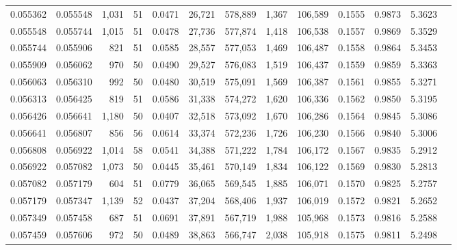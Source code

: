 \begin{tabular}{rrrrrrrrrrrrr}
0.055362 & 0.055548 & 1,031 &  51 &                                     0.0471 &  26,721 & 578,889 &   1,367 & 106,589 & 0.1555 & 0.9873 & 5.3623 \\
0.055548 & 0.055744 & 1,015 &  51 &                                     0.0478 &  27,736 & 577,874 &   1,418 & 106,538 & 0.1557 & 0.9869 & 5.3529 \\
0.055744 & 0.055906 &   821 &  51 &                                     0.0585 &  28,557 & 577,053 &   1,469 & 106,487 & 0.1558 & 0.9864 & 5.3453 \\
0.055909 & 0.056062 &   970 &  50 &                                     0.0490 &  29,527 & 576,083 &   1,519 & 106,437 & 0.1559 & 0.9859 & 5.3363 \\
0.056063 & 0.056310 &   992 &  50 &                                     0.0480 &  30,519 & 575,091 &   1,569 & 106,387 & 0.1561 & 0.9855 & 5.3271 \\
0.056313 & 0.056425 &   819 &  51 &                                     0.0586 &  31,338 & 574,272 &   1,620 & 106,336 & 0.1562 & 0.9850 & 5.3195 \\
0.056426 & 0.056641 & 1,180 &  50 &                                     0.0407 &  32,518 & 573,092 &   1,670 & 106,286 & 0.1564 & 0.9845 & 5.3086 \\
0.056641 & 0.056807 &   856 &  56 &                                     0.0614 &  33,374 & 572,236 &   1,726 & 106,230 & 0.1566 & 0.9840 & 5.3006 \\
0.056808 & 0.056922 & 1,014 &  58 &                                     0.0541 &  34,388 & 571,222 &   1,784 & 106,172 & 0.1567 & 0.9835 & 5.2912 \\
0.056922 & 0.057082 & 1,073 &  50 &                                     0.0445 &  35,461 & 570,149 &   1,834 & 106,122 & 0.1569 & 0.9830 & 5.2813 \\
0.057082 & 0.057179 &   604 &  51 &                                     0.0779 &  36,065 & 569,545 &   1,885 & 106,071 & 0.1570 & 0.9825 & 5.2757 \\
0.057179 & 0.057347 & 1,139 &  52 &                                     0.0437 &  37,204 & 568,406 &   1,937 & 106,019 & 0.1572 & 0.9821 & 5.2652 \\
0.057349 & 0.057458 &   687 &  51 &                                     0.0691 &  37,891 & 567,719 &   1,988 & 105,968 & 0.1573 & 0.9816 & 5.2588 \\
0.057459 & 0.057606 &   972 &  50 &                                     0.0489 &  38,863 & 566,747 &   2,038 & 105,918 & 0.1575 & 0.9811 & 5.2498 \\

\end{tabular}
